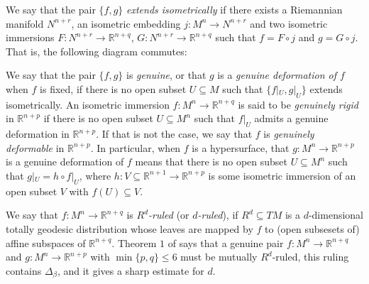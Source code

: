 \documentclass{article}
\theoremstyle{remark}
\begin{document}
We say that the pair $\{f,g\}$ {\it extends isometrically} if there exists a Riemannian manifold $N^{n+r}$, an isometric embedding $j:M^n\rightarrow N^{n+r}$ and two isometric immersions $F:N^{n+r}\rightarrow\mathbb{R}^{n+q}$, $G:N^{n+r}\rightarrow\mathbb{R}^{n+q}$ such that $f=F\circ j$ and $g=G\circ j$. That is, the following diagram commutes:
\begin{center}
\end{center}
We say that the pair $\{f,g\}$ is {\it genuine}, or that $g$ is a {\it genuine deformation of $f$} when $f$ is fixed, if there is no open subset $U\subseteq M$ such that $\{f|_U,g|_U\}$ extends isometrically. An isometric immersion $f:M^n\rightarrow\mathbb{R}^{n+q}$ is said to be {\it genuinely rigid} in $\mathbb{R}^{n+p}$ if there is no open subset $U\subseteq M^n$ such that $f|_U$ admits a genuine deformation in $\mathbb{R}^{n+p}$.
If that is not the case, we say that $f$ is {\it genuinely deformable} in $\mathbb{R}^{n+p}$.
In particular, when $f$ is a hypersurface, that $g:M^n\rightarrow\mathbb{R}^{n+p}$ is a genuine deformation of $f$ means that there is no open subset $U\subseteq M^n$ such that $g|_U=h\circ f|_U$, where $h:V\subseteq\mathbb{R}^{n+1}\rightarrow\mathbb{R}^{n+p}$ is some isometric immersion of an open subset $V$ with $f(U)\subseteq V$. 

We say that $f:M^n\rightarrow\mathbb{R}^{n+q}$ is $R^d${\it -ruled} (or $d${\it-ruled}), if $R^d\subseteq TM$ is a $d$-dimensional totally geodesic distribution whose leaves are mapped by $f$ to (open subsesets of) affine subspaces of $\mathbb{R}^{n+q}$. 
Theorem $1$ of \cite{DF3} says that a genuine pair $f:M^n\rightarrow\mathbb{R}^{n+q}$ and $g:M^n\rightarrow\mathbb{R}^{n+p}$ with $\min\{p,q\}\leq 6$ must be mutually $R^d$-ruled, this ruling contains $\Delta_\beta$, and it gives a sharp estimate for $d$. 
\end{document}
